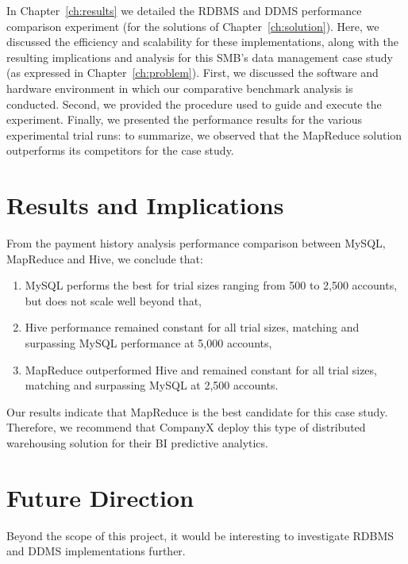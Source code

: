 In Chapter~\ref{ch:results} we detailed the RDBMS and DDMS performance comparison experiment (for the solutions of Chapter~\ref{ch:solution}). Here, we discussed the efficiency and scalability for these implementations, along with the resulting implications and analysis for this SMB's data management case study (as expressed in Chapter~\ref{ch:problem}). First, we discussed the software and hardware environment in which our comparative benchmark analysis is conducted. Second, we provided the procedure used to guide and execute the experiment. Finally, we presented the performance results for the various experimental trial runs: to summarize, we observed that the MapReduce solution outperforms its competitors for the case study.

\section{Results and Implications}
From the payment history analysis performance comparison between MySQL, MapReduce and Hive, we conclude that:

\begin{enumerate}
  \item MySQL performs the best for trial sizes ranging from 500 to 2,500 accounts, but does not scale well beyond that,
  \item Hive performance remained constant for all trial sizes, matching and surpassing MySQL performance at 5,000 accounts,
  \item MapReduce outperformed Hive and remained constant for all trial sizes, matching and surpassing MySQL at 2,500 accounts.
\end{enumerate}

Our results indicate that MapReduce is the best candidate for this case study. Therefore, we recommend that CompanyX deploy this type of distributed warehousing solution for their BI predictive analytics. 

\section{Future Direction}
Beyond the scope of this project, it would be interesting to investigate RDBMS and DDMS implementations further. 

